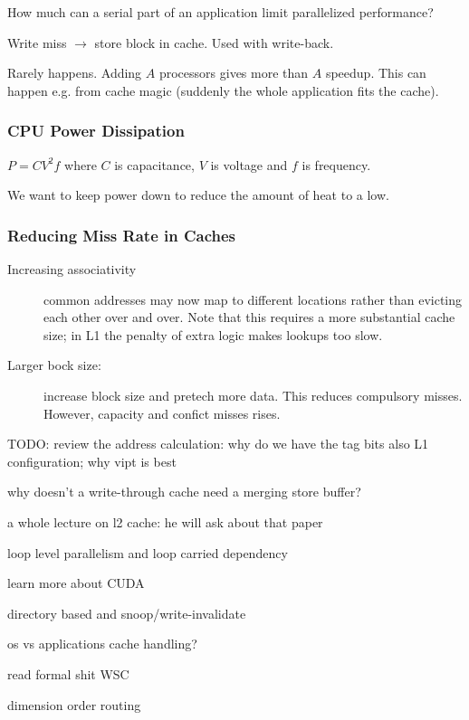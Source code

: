 \begin{definition}
    How much can a serial part of an application limit parallelized performance?
\end{definition}


\begin{definition}
    Write miss $\rightarrow$ store block in cache. Used with write-back.
\end{definition}



\begin{definition}
   Rarely happens. Adding $A$ processors gives more than $A$ speedup. This can happen e.g. from cache magic (suddenly the whole application fits the cache). 
\end{definition}


\subsubsection{CPU Power Dissipation}\label{sec:powerdissipation}
    $P = CV^{2}f$
    where $C$ is capacitance, $V$ is voltage and $f$ is frequency.

    We want to keep power down to reduce the amount of heat to a low.

\subsubsection{Reducing Miss Rate in Caches}
\begin{description}
    \item[Increasing associativity] common addresses may now map to different locations rather than evicting each other over and over. Note that this requires 
    a more substantial cache size; in L1 the penalty of extra logic makes lookups
    too slow.
    \item[Larger bock size:] increase block size and pretech more data. This
    reduces compulsory misses. However, capacity and confict misses rises.
\end{description}

TODO: review the address calculation: why do we have the tag bits
    also L1 configuration; why vipt is best

why doesn't a write-through cache need a merging store buffer?

a whole lecture on l2 cache: he will ask about that paper

loop level parallelism  and loop carried dependency

learn more about CUDA

directory based and snoop/write-invalidate

os vs applications cache handling?

read formal shit WSC

dimension order routing
